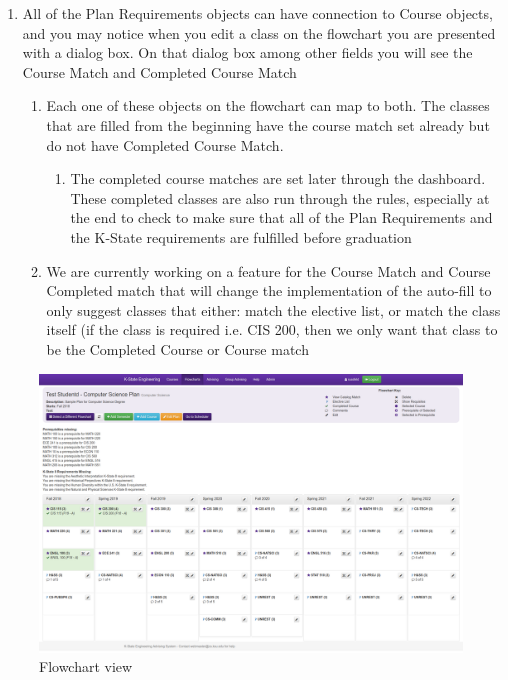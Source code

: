 \documentclass[12pt]{article}
\begin{document}
\begin{enumerate}
    \begin{enumerate}
        \item All of the Plan Requirements objects can have connection to Course objects, and you may notice when you edit a class on the flowchart you are presented with a dialog box. On that dialog box among other fields you will see the Course Match and Completed Course Match
        \begin{enumerate}
            \item Each one of these objects on the flowchart can map to both. The classes that are filled from the beginning have the course match set already but do not have Completed Course Match.
            \begin{enumerate}
                \item The completed course matches are set later through the dashboard. These completed classes are also run through the rules, especially at the end to check to make sure that all of the Plan Requirements and the K-State requirements are fulfilled before graduation
            \end{enumerate}
            \item We are currently working on a feature for the Course Match and Course Completed match that will change the implementation of the auto-fill to only suggest classes that either: match the elective list, or match the class itself (if the class is required i.e. CIS 200, then we only want that class to be the Completed Course or Course match
        \end{enumerate}
    \end{enumerate}
\end{enumerate}

\begin{figure}
    \centering
    \includegraphics[width=\textwidth]{flowchart.png}
    \caption{Flowchart view}
    \label{fig:flowchart}
\end{figure}
\end{document}
